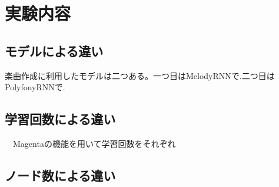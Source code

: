 \chapter{実験内容}
\section{モデルによる違い}
楽曲作成に利用したモデルは二つある。一つ目はMelodyRNNで.二つ目はPolyfonyRNNで.
\section{学習回数による違い}

　Magentaの機能を用いて学習回数をそれぞれ
\section{ノード数による違い}

